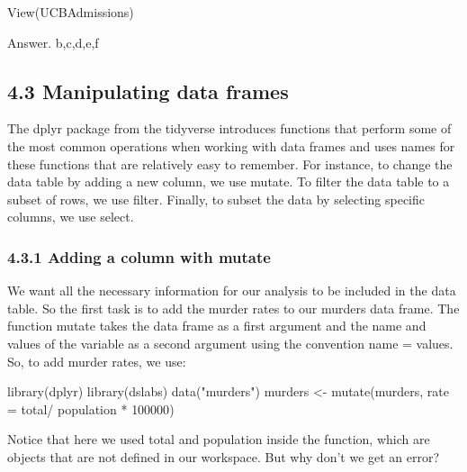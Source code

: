 \documentclass[
]{article}
\newenvironment{Shaded}{\begin{snugshade}}{\end{snugshade}}
\newcommand{\AttributeTok}[1]{\textcolor[rgb]{0.77,0.63,0.00}{#1}}
\newcommand{\DecValTok}[1]{\textcolor[rgb]{0.00,0.00,0.81}{#1}}
\newcommand{\FunctionTok}[1]{\textcolor[rgb]{0.00,0.00,0.00}{#1}}
\newcommand{\NormalTok}[1]{#1}
\newcommand{\OtherTok}[1]{\textcolor[rgb]{0.56,0.35,0.01}{#1}}
\newcommand{\SpecialCharTok}[1]{\textcolor[rgb]{0.00,0.00,0.00}{#1}}
\newcommand{\StringTok}[1]{\textcolor[rgb]{0.31,0.60,0.02}{#1}}
\begin{document}
\begin{Shaded}
\begin{Highlighting}[]
\FunctionTok{View}\NormalTok{(UCBAdmissions)}
\end{Highlighting}
\end{Shaded}

Answer. b,c,d,e,f

\hypertarget{manipulating-data-frames}{%
\subsection{4.3 Manipulating data
frames}\label{manipulating-data-frames}}

The dplyr package from the tidyverse introduces functions that perform
some of the most common operations when working with data frames and
uses names for these functions that are relatively easy to remember. For
instance, to change the data table by adding a new column, we use
mutate. To filter the data table to a subset of rows, we use filter.
Finally, to subset the data by selecting specific columns, we use
select.

\hypertarget{adding-a-column-with-mutate}{%
\subsubsection{4.3.1 Adding a column with
mutate}\label{adding-a-column-with-mutate}}

We want all the necessary information for our analysis to be included in
the data table. So the first task is to add the murder rates to our
murders data frame. The function mutate takes the data frame as a first
argument and the name and values of the variable as a second argument
using the convention name = values. So, to add murder rates, we use:

\begin{Shaded}
\begin{Highlighting}[]
\FunctionTok{library}\NormalTok{(dplyr)}
\FunctionTok{library}\NormalTok{(dslabs)}
\FunctionTok{data}\NormalTok{(}\StringTok{"murders"}\NormalTok{)}
\NormalTok{murders }\OtherTok{\textless{}{-}} \FunctionTok{mutate}\NormalTok{(murders, }\AttributeTok{rate =}\NormalTok{ total}\SpecialCharTok{/}\NormalTok{ population }\SpecialCharTok{*} \DecValTok{100000}\NormalTok{)}
\end{Highlighting}
\end{Shaded}

Notice that here we used total and population inside the function, which
are objects that are not defined in our workspace. But why don't we get
an error?
\end{document}
